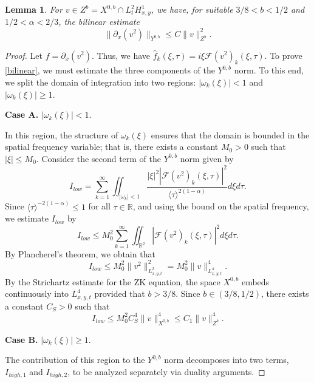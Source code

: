 \documentclass[11pt]{article}
\numberwithin{equation}{section}
\newtheorem{lemma}{Lemma}
\begin{document}
\begin{lemma}
For $v \in Z^{b} = X^{0,b} \cap L^{2}_{t} H^{1}_{x,y}$, we have, for suitable $3/8<b<1/2$ and $1/2<\alpha<2/3$, the bilinear estimate
\begin{equation}\label{bilinear}
\|\partial_{x}(v^{2})\|_{Y^{0,b}}\leq C\|v\|_{Z^{b}}^{2}.
\end{equation}
\end{lemma}
\begin{proof}
Let $f = \partial_{x}(v^2)$. Thus, we have $\widehat{f}_{k}(\xi,\tau) = i\xi \mathcal{F}(v^{2})_{k}(\xi,\tau)$. To prove \eqref{bilinear}, we must estimate the three components of the $Y^{0,b}$ norm. To this end, we split the domain of integration into two regions: $|\omega_{k}(\xi)| < 1$ and $|\omega_{k}(\xi)| \ge 1$.

\textbf{Case A.} $|\omega_{k}(\xi)| < 1$.

In this region, the structure of $\omega_{k}(\xi)$ ensures that the
domain is bounded in the spatial frequency variable; that is, there
exists a constant $M_0 > 0$ such that $|\xi| \le M_0$. Consider the
second term of the $Y^{0,b}$ norm given by
\begin{equation}I_{low} = \sum_{k=1}^{\infty} \iint_{|\omega_{k}| < 1} \frac{|\xi|^{2} |\mathcal{F}(v^{2})_{k}(\xi,\tau)|^{2}}{\langle \tau \rangle^{2(1-\alpha)}} d\xi d\tau.\end{equation}
Since $\langle \tau \rangle^{-2(1-\alpha)} \le 1$ for all $\tau \in
\mathbb{R}$, and using the bound on the spatial frequency, we
estimate $I_{low}$ by
\begin{equation}
    I_{low} \le M_0^2 \sum_{k=1}^{\infty} \iint_{\mathbb{R}^2} |\mathcal{F}(v^2)_k(\xi,\tau)|^2 d\xi d\tau.
\end{equation}
By Plancherel's theorem, we obtain that
\begin{equation}
    I_{low} \le M_{0}^{2} \|v^{2}\|_{L^{2}_{x,y,t}}^{2} = M_{0}^{2} \|v\|_{L^{4}_{x,y,t}}^{4}.
\end{equation}
By the Strichartz estimate for the ZK equation, the space $X^{0,b}$
embeds continuously into $L^{4}_{x,y,t}$ provided that $b > 3/8$.
Since $b \in (3/8, 1/2)$, there exists a constant $C_{S} > 0$ such
that
\begin{equation}
    I_{low} \le M_{0}^{2} C_{S}^{4} \|v\|_{X^{0,b}}^{4} \le C_{1} \|v\|_{Z^{b}}^{4}.
\end{equation}

\textbf{Case B.} $|\omega_{k}(\xi)| \ge 1$.

The contribution of this region to the $Y^{0,b}$ norm decomposes
into two terms, $I_{high,1}$ and $I_{high,2}$, to be analyzed
separately via duality arguments.


\end{proof}
\end{document}
